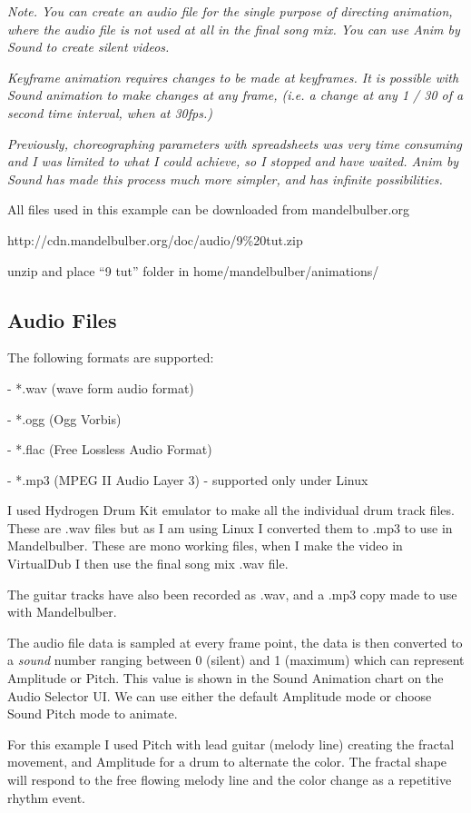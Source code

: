 \emph{Note. You can create an audio file for the single purpose of
directing animation, where the audio file is not used at all in the
final song mix. You can use Anim by Sound to create silent videos.}

\emph{Keyframe animation requires changes to be made at keyframes. It is
possible with Sound animation to make changes at any frame, (i.e. a
change at any 1 / 30 of a second time interval, when at 30fps.)}

\emph{Previously, choreographing parameters with spreadsheets was very
time consuming and I was limited to what I could achieve, so I stopped
and have waited. Anim by Sound has made this process much more simpler,
and has infinite possibilities.}

All files used in this example can be downloaded from mandelbulber.org

http://cdn.mandelbulber.org/doc/audio/9\%20tut.zip

unzip and place ``9 tut'' folder in home/mandelbulber/animations/

\subsection{Audio Files}\label{audio-files}

The following formats are supported:

- *.wav (wave form audio format)

- *.ogg (Ogg Vorbis)

- *.flac (Free Lossless Audio Format)

- *.mp3 (MPEG II Audio Layer 3) - supported only under Linux

I used Hydrogen Drum Kit emulator to make all the individual drum track
files. These are .wav files but as I am using Linux I converted them to
.mp3 to use in Mandelbulber. These are mono working files, when I make
the video in VirtualDub I then use the final song mix .wav file.

The guitar tracks have also been recorded as .wav, and a .mp3 copy made
to use with Mandelbulber.

The audio file data is sampled at every frame point, the data is then
converted to a \emph{sound} number ranging between 0 (silent) and 1
(maximum) which can represent Amplitude or Pitch. This value is shown in
the Sound Animation chart on the Audio Selector UI. We can use either
the default Amplitude mode or choose Sound Pitch mode to animate.

For this example I used Pitch with lead guitar (melody line) creating
the fractal movement, and Amplitude for a drum to alternate the color.
The fractal shape will respond to the free flowing melody line and the
color change as a repetitive rhythm event.

